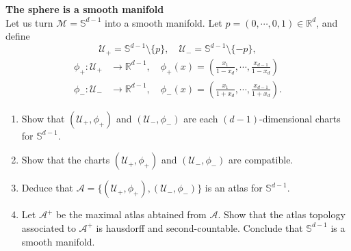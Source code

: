 \documentclass[en, oneside]{assignment}
\begin{document}
\begin{prob} \textbf{The sphere is a smooth manifold}\\
    Let us turn $\mathcal M = \mathbb S ^{d-1}$ into a smooth manifold. Let $p = (0, \cdots, 0, 1) \in \mathbb R ^d$, and define
    \begin{equation*}
        \mathcal U _+ = \mathbb S ^{d-1} \setminus \{p\}, \quad \mathcal U_- = \mathbb S ^{d-1} \setminus \{-p\},
    \end{equation*}
    \begin{align*}
        \phi _+ : \mathcal U _+ &\rightarrow \mathbb R ^{d-1}, \quad \phi _+ (x) = \left(\frac{x_1}{1 - x_d}, \cdots, \frac{x_{d-1}}{1 - x_d}\right) \\
        \phi _- : \mathcal U _- &\rightarrow \mathbb R ^{d-1}, \quad \phi _- (x) = \left(\frac{x_1}{1 + x_d}, \cdots, \frac{x_{d-1}}{1 + x_d}\right).
    \end{align*}
    \begin{enumerate}[label=(\arabic*)]
        \item Show that $(\mathcal U _+, \phi _+)$ and $(\mathcal U _-, \phi _-)$ are each $(d-1)$-dimensional charts for $\mathbb S ^{d-1}$.
        \item Show that the charts $(\mathcal U _+, \phi _+)$ and $(\mathcal U _-, \phi _-)$ are compatible.
        \item Deduce that $\mathcal A = \{(\mathcal U _+, \phi _+), (\mathcal U _-, \phi _-)\}$ is an atlas for $\mathbb S ^{d-1}$.
        \item Let $\mathcal A ^+$ be the maximal atlas abtained from $\mathcal A$. 
        Show that the atlas topology associated to $\mathcal A ^+$ is hausdorff and second-countable. Conclude that $\mathbb S ^{d-1}$ is a smooth manifold.
    \end{enumerate}
\end{prob}
\end{document}
